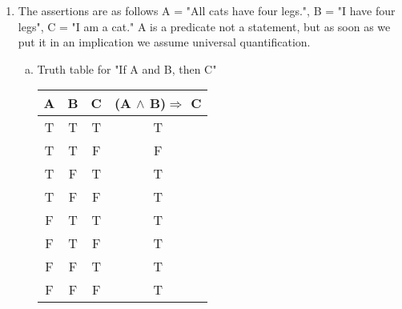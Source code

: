 \documentclass[a4paper, 11pt]{report}
\theoremstyle{plain}
\theoremstyle{definition}
\newcommand{\impl}{\Longrightarrow}
\begin{document}
\begin{enumerate}
  \item 
    The assertions are as follows A = "All cats have four legs.", B = "I have
    four legs", C = "I am a cat." A is a predicate not a statement, but as soon
    as we put it in an implication we assume universal quantification.
    \begin{enumerate}[a)]
      \item Truth table for "If A and B, then C"
        \begin{table}[h!]
          \centering
        \begin{tabular}{cccc}
          \hline
          A&  B&  C& (A $\land$ B)$\impl$ C\\
          \hline
         T&  T&  T& T\\
         T&  T&  F& F\\
         T&  F&  T& T\\
         T&  F&  F& T\\
         F&  T&  T& T\\
         F&  T&  F& T\\
         F&  F&  T& T\\
         F&  F&  F& T\\
          \hline
        \end{tabular}
      \end{table}


\end{enumerate}
\end{enumerate}
\end{document}
